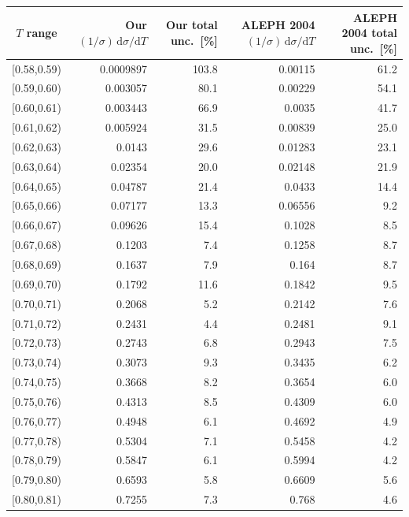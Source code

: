 \begin{table}[t!]
\centering
\scriptsize
\begin{tabular}{c r r r r}
\hline
$T$ range & Our $(1/\sigma)\,\mathrm{d}\sigma/\mathrm{d}T$ & Our total unc.\ [\%] & ALEPH 2004 $(1/\sigma)\,\mathrm{d}\sigma/\mathrm{d}T$ & ALEPH 2004 total unc.\ [\%] \\
\hline
{[0.58,0.59)} & 0.0009897 & 103.8 & 0.00115 & 61.2 \\
{[0.59,0.60)} & 0.003057 & 80.1 & 0.00229 & 54.1 \\
{[0.60,0.61)} & 0.003443 & 66.9 & 0.0035 & 41.7 \\
{[0.61,0.62)} & 0.005924 & 31.5 & 0.00839 & 25.0 \\
{[0.62,0.63)} & 0.0143 & 29.6 & 0.01283 & 23.1 \\
{[0.63,0.64)} & 0.02354 & 20.0 & 0.02148 & 21.9 \\
{[0.64,0.65)} & 0.04787 & 21.4 & 0.0433 & 14.4 \\
{[0.65,0.66)} & 0.07177 & 13.3 & 0.06556 & 9.2 \\
{[0.66,0.67)} & 0.09626 & 15.4 & 0.1028 & 8.5 \\
{[0.67,0.68)} & 0.1203 & 7.4 & 0.1258 & 8.7 \\
{[0.68,0.69)} & 0.1637 & 7.9 & 0.164 & 8.7 \\
{[0.69,0.70)} & 0.1792 & 11.6 & 0.1842 & 9.5 \\
{[0.70,0.71)} & 0.2068 & 5.2 & 0.2142 & 7.6 \\
{[0.71,0.72)} & 0.2431 & 4.4 & 0.2481 & 9.1 \\
{[0.72,0.73)} & 0.2743 & 6.8 & 0.2943 & 7.5 \\
{[0.73,0.74)} & 0.3073 & 9.3 & 0.3435 & 6.2 \\
{[0.74,0.75)} & 0.3668 & 8.2 & 0.3654 & 6.0 \\
{[0.75,0.76)} & 0.4313 & 8.5 & 0.4309 & 6.0 \\
{[0.76,0.77)} & 0.4948 & 6.1 & 0.4692 & 4.9 \\
{[0.77,0.78)} & 0.5304 & 7.1 & 0.5458 & 4.2 \\
{[0.78,0.79)} & 0.5847 & 6.1 & 0.5994 & 4.2 \\
{[0.79,0.80)} & 0.6593 & 5.8 & 0.6609 & 5.6 \\
{[0.80,0.81)} & 0.7255 & 7.3 & 0.768 & 4.6 \\

\end{tabular}
\end{table}
